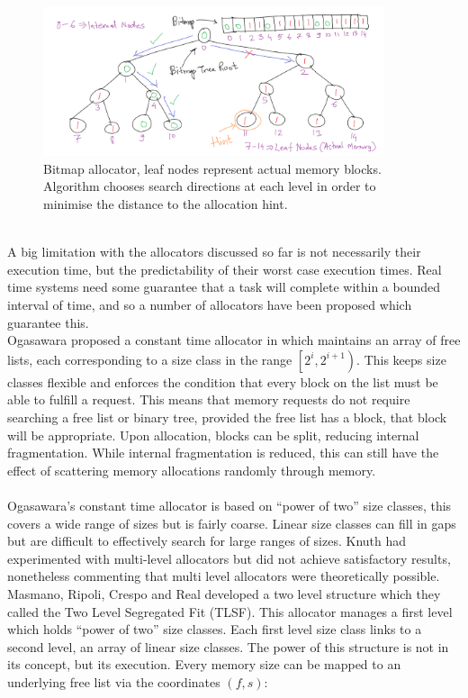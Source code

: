 \documentclass{article}
\begin{document}
\\
\begin{figure}[h]
	\centering
	\includegraphics[width=10cm]{bitmap_allocator}
	\captionsetup{width=10cm}
	\caption{Bitmap allocator, leaf nodes represent actual memory blocks. Algorithm chooses search directions at each level in order to minimise the distance to the allocation hint.}
\end{figure}
\\
A big limitation with the allocators discussed so far is not necessarily their execution time, but the predictability of their worst case execution times. Real time systems need some guarantee that a task will complete within a bounded interval of time, and so a number of allocators have been proposed which guarantee this.\\
Ogasawara proposed a constant time allocator in \cite{528746} which maintains an array of free lists, each corresponding to a size class in the range $\left[2^i, 2^{i + 1}\right)$. This keeps size classes flexible and enforces the condition that every block on the list must be able to fulfill a request. This means that memory requests do not require searching a free list or binary tree, provided the free list has a block, that block will be appropriate. Upon allocation, blocks can be split, reducing internal fragmentation. While internal fragmentation is reduced, this can still have the effect of scattering memory allocations randomly through memory.\\
\\
Ogasawara's constant time allocator is based on ``power of two'' size classes, this covers a wide range of sizes but is fairly coarse. Linear size classes can fill in gaps but are difficult to effectively search for large ranges of sizes. Knuth had experimented with multi-level allocators but did not achieve satisfactory results, nonetheless commenting that multi level allocators were theoretically possible.\\
Masmano, Ripoli, Crespo and Real \cite{inproceedings} developed a two level structure which they called the Two Level Segregated Fit (TLSF). This allocator manages a first level which holds ``power of two'' size classes. Each first level size class links to a second level, an array of linear size classes. The power of this structure is not in its concept, but its execution. Every memory size can be mapped to an underlying free list via the coordinates $\left(f,s\right)$:\\
\end{document}
